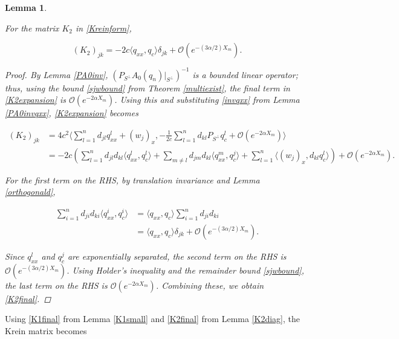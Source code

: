 \documentclass[12pt]{article}
\newtheorem{lemma}{Lemma}
\begin{document}
\begin{lemma}\label{K2diag}

For the matrix $K_2$ in \eqref{Kreinform}, 

\begin{equation}\label{K2final}
(K_2)_{jk} 
= -2 c \langle q_{xx}, q_c \rangle \delta_{jk} + \mathcal{O}(e^{-(3 \alpha/2) X_m}).
\end{equation}

\begin{proof}
By Lemma \ref{PA0inv}, $(P_{S^\perp} A_0(q_n)|_{S^\perp})^{-1}$ is a bounded linear operator; thus, using the bound \eqref{sjwbound} from Theorem \ref{multiexist}, the final term in \eqref{K2expansion} is $\mathcal{O}(e^{-2 \alpha X_m})$. Using this and substituting \eqref{invqxx} from Lemma \ref{PA0invqxx}, \eqref{K2expansion} becomes

\begin{align*}
(K_2)_{jk} 
&= 4 c^2 \langle \sum_{l = 1}^{n} d_{jl} q^l_{xx} + (w_j)_x, 
-\frac{1}{2c}\sum_{l = 1}^{n} d_{kl} P_{S^\perp} q^l_c + \mathcal{O}(e^{-2 \alpha X_m}) \rangle \\
&= -2 c \left( \sum_{l = 1}^{n} d_{jl} d_{kl} \langle q^l_{xx}, q^l_c \rangle
+ \sum_{m\neq l} d_{jm} d_{kl} \langle q^m_{xx}, q^j_c \rangle
+ \sum_{l=1}^n \langle (w_j)_x, d_{kl} q^l_c \rangle \right) + \mathcal{O}(e^{-2 \alpha X_m}).
\end{align*}

For the first term on the RHS, by translation invariance and Lemma \ref{orthogonald},

\begin{align*}
\sum_{i = 1}^{n} d_{ji} d_{ki} \langle q^i_{xx}, q^i_c \rangle
&= \langle q_{xx}, q_c \rangle \sum_{i = 1}^{n} d_{ji} d_{ki} \\
&= \langle q_{xx}, q_c \rangle \delta_{jk} + \mathcal{O}(e^{-(3 \alpha/2) X_m}).
\end{align*}

Since $q^l_{xx}$ and $q^j_c$ are exponentially separated, the second term on the RHS is $\mathcal{O}(e^{-(3 \alpha/2) X_m})$. Using Holder's inequality and the remainder bound \eqref{sjwbound}, the last term on the RHS is $\mathcal{O}(e^{-2 \alpha X_m})$. Combining these, we obtain \eqref{K2final}.

\end{proof}
\end{lemma}

Using \eqref{K1final} from Lemma \ref{K1small} and \eqref{K2final} from Lemma \eqref{K2diag}, the Krein matrix becomes
\end{document}
